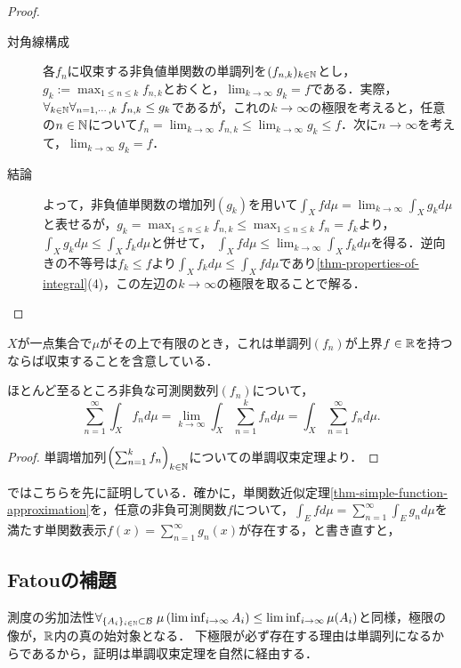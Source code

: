 \documentclass[uplatex, dvipdfmx]{jsreport}
\begin{document}
\begin{proof}
\begin{description}
        \item[対角線構成]
        各$f_n$に収束する非負値単関数の単調列を$(f_{n,k})_{k\in\mathbb{N}}$とし，$g_k:=\max_{1\le n\le k}f_{n,k}$とおくと，$\lim_{k\to\infty}g_k=f$である．実際，$\forall_{k\in\mathbb{N}}\forall_{n=1,\cdots,k}\;f_{n,k}\le g_k$であるが，これの$k\to\infty$の極限を考えると，任意の$n\in\mathbb{N}$について$f_n=\lim_{k\to\infty}f_{n,k}\le\lim_{k\to\infty}g_k\le f$．次に$n\to\infty$を考えて，$\lim_{k\to\infty}g_k=f$．
        \item[結論]
        よって，非負値単関数の増加列$(g_k)$を用いて$\int_Xfd\mu=\lim_{k\to\infty}\int_Xg_kd\mu$と表せるが，$g_k=\max_{1\le n\le k}f_{n,k}\le\max_{1\le n\le k}f_n=f_k$より，$\int_Xg_kd\mu\le\int_Xf_kd\mu$と併せて，
        $\int_Xfd\mu\le\lim_{k\to\infty}\int_Xf_kd\mu$を得る．逆向きの不等号は$f_k\le f$より$\int_Xf_kd\mu\le\int_Xfd\mu$であり\ref{thm-properties-of-integral}(4)，この左辺の$k\to\infty$の極限を取ることで解る．
    \end{description}
\end{proof}
\begin{remark}
    $X$が一点集合で$\mu$がその上で有限のとき，これは単調列$(f_n)$が上界$f\in\mathbb{R}$を持つならば収束することを含意している．
\end{remark}

\begin{corollary}
    ほとんど至るところ非負な可測関数列$(f_n)$について，
    \[\sum^\infty_{n=1}\int_Xf_nd\mu=\lim_{k\to\infty}\int_X\sum^k_{n=1}f_nd\mu=\int_X\sum^\infty_{n=1}f_nd\mu.\]
\end{corollary}
\begin{proof}
    単調増加列$\left(\sum^k_{n=1}f_n\right)_{k\in\mathbb{N}}$についての単調収束定理より．
\end{proof}
\begin{remark}
    \cite{伊藤}ではこちらを先に証明している．確かに，単関数近似定理\ref{thm-simple-function-approximation}を，任意の非負可測関数$f$について，$\int_Efd\mu=\sum^\infty_{n=1}\int_Eg_nd\mu$を満たす単関数表示$f(x)=\sum^\infty_{n=1}g_n(x)$が存在する，と書き直すと，
\end{remark}

\subsection{Fatouの補題}

\begin{tcolorbox}[colframe=ForestGreen, colback=ForestGreen!10!white,breakable,colbacktitle=ForestGreen!40!white,coltitle=black,fonttitle=\bfseries\sffamily,
title=]
    測度の劣加法性$\forall_{\{A_i\}_{i\in\mathbb{N}}\subset\mathcal{B}}\;\mu\left(\liminf_{i\to\infty}A_i\right)\le\liminf_{i\to\infty}\mu(A_i)$と同様，極限の像が，$\mathbb{R}$内の真の始対象となる．
    下極限が必ず存在する理由は単調列になるからであるから，証明は単調収束定理を自然に経由する．
\end{tcolorbox}
\end{document}
